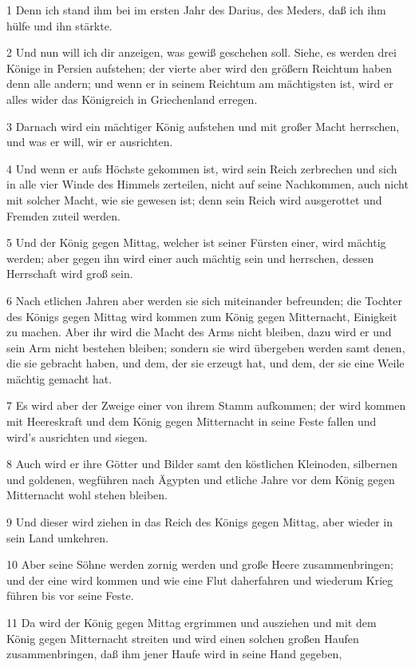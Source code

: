 \par 1 Denn ich stand ihm bei im ersten Jahr des Darius, des Meders, daß ich ihm hülfe und ihn stärkte.
\par 2 Und nun will ich dir anzeigen, was gewiß geschehen soll. Siehe, es werden drei Könige in Persien aufstehen; der vierte aber wird den größern Reichtum haben denn alle andern; und wenn er in seinem Reichtum am mächtigsten ist, wird er alles wider das Königreich in Griechenland erregen.
\par 3 Darnach wird ein mächtiger König aufstehen und mit großer Macht herrschen, und was er will, wir er ausrichten.
\par 4 Und wenn er aufs Höchste gekommen ist, wird sein Reich zerbrechen und sich in alle vier Winde des Himmels zerteilen, nicht auf seine Nachkommen, auch nicht mit solcher Macht, wie sie gewesen ist; denn sein Reich wird ausgerottet und Fremden zuteil werden.
\par 5 Und der König gegen Mittag, welcher ist seiner Fürsten einer, wird mächtig werden; aber gegen ihn wird einer auch mächtig sein und herrschen, dessen Herrschaft wird groß sein.
\par 6 Nach etlichen Jahren aber werden sie sich miteinander befreunden; die Tochter des Königs gegen Mittag wird kommen zum König gegen Mitternacht, Einigkeit zu machen. Aber ihr wird die Macht des Arms nicht bleiben, dazu wird er und sein Arm nicht bestehen bleiben; sondern sie wird übergeben werden samt denen, die sie gebracht haben, und dem, der sie erzeugt hat, und dem, der sie eine Weile mächtig gemacht hat.
\par 7 Es wird aber der Zweige einer von ihrem Stamm aufkommen; der wird kommen mit Heereskraft und dem König gegen Mitternacht in seine Feste fallen und wird's ausrichten und siegen.
\par 8 Auch wird er ihre Götter und Bilder samt den köstlichen Kleinoden, silbernen und goldenen, wegführen nach Ägypten und etliche Jahre vor dem König gegen Mitternacht wohl stehen bleiben.
\par 9 Und dieser wird ziehen in das Reich des Königs gegen Mittag, aber wieder in sein Land umkehren.
\par 10 Aber seine Söhne werden zornig werden und große Heere zusammenbringen; und der eine wird kommen und wie eine Flut daherfahren und wiederum Krieg führen bis vor seine Feste.
\par 11 Da wird der König gegen Mittag ergrimmen und ausziehen und mit dem König gegen Mitternacht streiten und wird einen solchen großen Haufen zusammenbringen, daß ihm jener Haufe wird in seine Hand gegeben,
